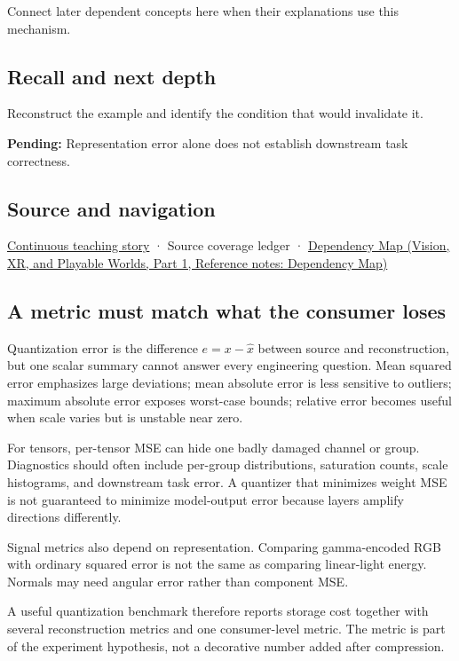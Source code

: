 \hypertarget{appendix-537171d69d27-used-by}{}

Connect later dependent concepts here when their explanations use this mechanism.

\subsection{Recall and next depth}\label{appendix-537171d69d27-recall-and-next-depth}

\hypertarget{appendix-537171d69d27-recall-and-next-depth}{}

Reconstruct the example and identify the condition that would invalidate it.

\textbf{Pending:} Representation error alone does not establish downstream task correctness.

\subsection{Source and navigation}\label{appendix-537171d69d27-source-and-navigation}

\hypertarget{appendix-537171d69d27-source-and-navigation}{}

\hyperref[01-foundations-i-ch001-choosing-what-information-to-keep]{Continuous teaching story} · {Source coverage ledger} · \href{../07-Vision-XR-and-Playable-Worlds-P01/main.pdf\#nameddest=appendix-4ad47bdd269a}{Dependency Map (Vision, XR, and Playable Worlds, Part 1, Reference notes: Dependency Map)}

\subsection{A metric must match what the consumer loses}\label{appendix-537171d69d27-a-metric-must-match-what-the-consumer-loses}

\hypertarget{appendix-537171d69d27-a-metric-must-match-what-the-consumer-loses}{}

Quantization error is the difference \(e=x-\hat x\) between source and reconstruction, but one scalar summary cannot answer every engineering question. Mean squared error emphasizes large deviations; mean absolute error is less sensitive to outliers; maximum absolute error exposes worst-case bounds; relative error becomes useful when scale varies but is unstable near zero.

For tensors, per-tensor MSE can hide one badly damaged channel or group. Diagnostics should often include per-group distributions, saturation counts, scale histograms, and downstream task error. A quantizer that minimizes weight MSE is not guaranteed to minimize model-output error because layers amplify directions differently.

Signal metrics also depend on representation. Comparing gamma-encoded RGB with ordinary squared error is not the same as comparing linear-light energy. Normals may need angular error rather than component MSE.

A useful quantization benchmark therefore reports storage cost together with several reconstruction metrics and one consumer-level metric. The metric is part of the experiment hypothesis, not a decorative number added after compression.
